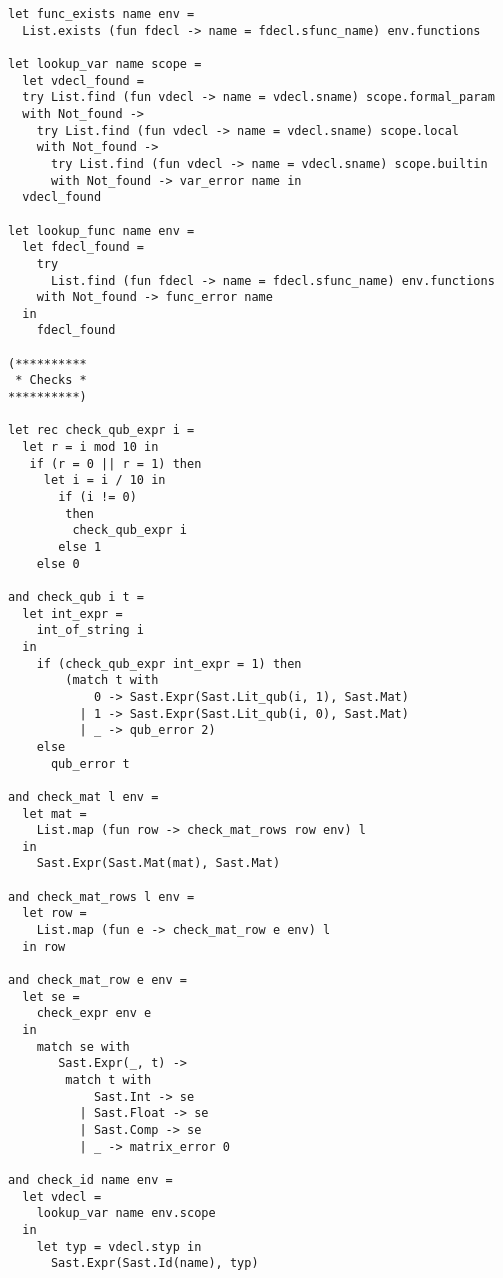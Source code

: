\begin{lstlisting}
let func_exists name env =
  List.exists (fun fdecl -> name = fdecl.sfunc_name) env.functions

let lookup_var name scope =
  let vdecl_found = 
  try List.find (fun vdecl -> name = vdecl.sname) scope.formal_param
  with Not_found ->
    try List.find (fun vdecl -> name = vdecl.sname) scope.local
    with Not_found ->
      try List.find (fun vdecl -> name = vdecl.sname) scope.builtin
      with Not_found -> var_error name in
  vdecl_found

let lookup_func name env =
  let fdecl_found = 
    try
      List.find (fun fdecl -> name = fdecl.sfunc_name) env.functions
    with Not_found -> func_error name
  in
    fdecl_found

(**********
 * Checks *
**********)

let rec check_qub_expr i =
  let r = i mod 10 in
   if (r = 0 || r = 1) then
     let i = i / 10 in
       if (i != 0)
        then
         check_qub_expr i
       else 1
    else 0

and check_qub i t =
  let int_expr =
    int_of_string i
  in
    if (check_qub_expr int_expr = 1) then
        (match t with
            0 -> Sast.Expr(Sast.Lit_qub(i, 1), Sast.Mat)
          | 1 -> Sast.Expr(Sast.Lit_qub(i, 0), Sast.Mat)
          | _ -> qub_error 2)
    else
      qub_error t

and check_mat l env =
  let mat = 
    List.map (fun row -> check_mat_rows row env) l
  in
    Sast.Expr(Sast.Mat(mat), Sast.Mat)

and check_mat_rows l env =
  let row =
    List.map (fun e -> check_mat_row e env) l
  in row

and check_mat_row e env =
  let se =
    check_expr env e
  in
    match se with
       Sast.Expr(_, t) ->
        match t with
            Sast.Int -> se
          | Sast.Float -> se
          | Sast.Comp -> se 
          | _ -> matrix_error 0

and check_id name env =
  let vdecl =
    lookup_var name env.scope
  in
    let typ = vdecl.styp in
      Sast.Expr(Sast.Id(name), typ)


\end{lstlisting}
